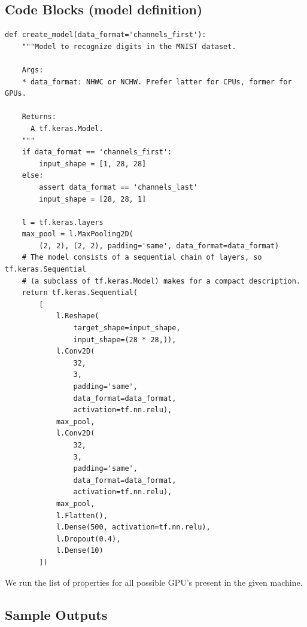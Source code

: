 \subsection {Code Blocks (model definition)}
\begin{lstlisting}
def create_model(data_format='channels_first'):
    """Model to recognize digits in the MNIST dataset.

    Args:
    * data_format: NHWC or NCHW. Prefer latter for CPUs, former for GPUs.

    Returns:
      A tf.keras.Model.
    """
    if data_format == 'channels_first':
        input_shape = [1, 28, 28]
    else:
        assert data_format == 'channels_last'
        input_shape = [28, 28, 1]

    l = tf.keras.layers
    max_pool = l.MaxPooling2D(
        (2, 2), (2, 2), padding='same', data_format=data_format)
    # The model consists of a sequential chain of layers, so tf.keras.Sequential
    # (a subclass of tf.keras.Model) makes for a compact description.
    return tf.keras.Sequential(
        [
            l.Reshape(
                target_shape=input_shape,
                input_shape=(28 * 28,)),
            l.Conv2D(
                32,
                3,
                padding='same',
                data_format=data_format,
                activation=tf.nn.relu),
            max_pool,
            l.Conv2D(
                32,
                3,
                padding='same',
                data_format=data_format,
                activation=tf.nn.relu),
            max_pool,
            l.Flatten(),
            l.Dense(500, activation=tf.nn.relu),
            l.Dropout(0.4),
            l.Dense(10)
        ])
\end{lstlisting}

We run the list of properties for all possible GPU's present in the given machine.

\bigskip

\subsection{Sample Outputs}

